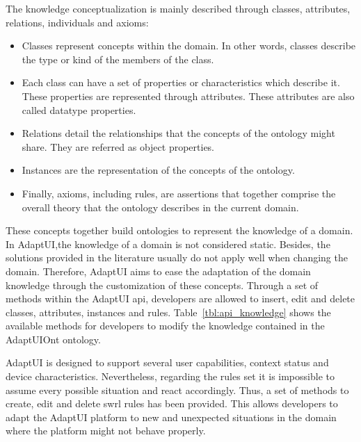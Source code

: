 The knowledge conceptualization is mainly described through classes, attributes,
relations, individuals and axioms: 

\begin{itemize}
  \item Classes represent concepts within the domain. In other words, classes
  describe the type or kind of the members of the class.
  
  \item Each class can have a set of properties or characteristics which describe
  it. These properties are represented through attributes. These attributes
  are also called datatype properties.
  
  \item Relations detail the relationships that the concepts of the ontology
  might share. They are referred as object properties.
  \item Instances are the representation of the concepts of the
  ontology.
  
  \item Finally, axioms, including rules, are assertions that together comprise
  the overall theory that the ontology describes in the current domain.
\end{itemize}

These concepts together build ontologies to represent the knowledge of a domain.
In AdaptUI,the knowledge of a domain is not considered static. Besides, the 
solutions provided in the literature usually do not apply well when changing 
the domain. Therefore, AdaptUI aims to ease the adaptation of the domain 
knowledge through the customization of these concepts. Through a set of methods 
within the AdaptUI \ac{api}, developers are allowed to insert, edit and delete 
classes, attributes, instances and rules. Table~\ref{tbl:api_knowledge} shows 
the available methods for developers to modify the knowledge contained in the 
AdaptUIOnt ontology.

AdaptUI is designed to support several user capabilities, context status and
device characteristics. Nevertheless, regarding the rules set it is impossible
to assume every possible situation and react accordingly. Thus, a set of methods
to create, edit and delete \ac{swrl} rules has been provided. This allows developers
to adapt the AdaptUI platform to new and unexpected situations in the domain
where the platform might not behave properly.

